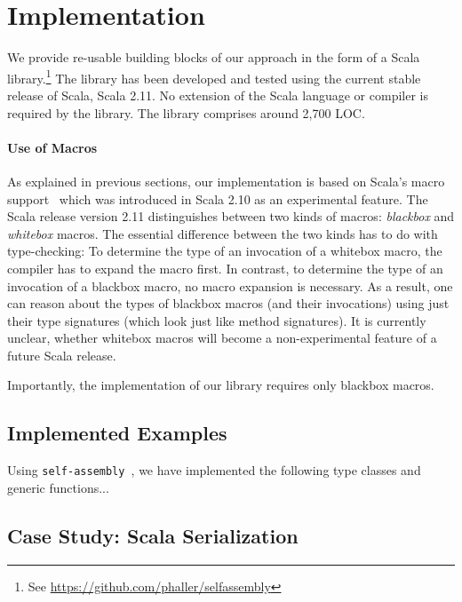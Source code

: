 \documentclass[preprint]{sigplanconf}
\newcommand{\selfassembly}{\texttt{self-assembly~}}
\begin{document}
\section{Implementation}

We provide re-usable building blocks of our approach in the form of a Scala
library.\footnote{See \url{https://github.com/phaller/selfassembly}} The
library has been developed and tested using the current stable release of
Scala, Scala 2.11. No extension of the Scala language or compiler is required
by the library. The library comprises around 2,700 LOC.


\paragraph{Use of Macros} As explained in previous sections, our
implementation is based on Scala's macro support~\cite{Burmako2012} which was
introduced in Scala 2.10 as an experimental feature. The Scala release version
2.11 distinguishes between two kinds of macros: \emph{blackbox} and
\emph{whitebox} macros. The essential difference between the two kinds has to
do with type-checking: To determine the type of an invocation of a whitebox
macro, the compiler has to expand the macro first. In contrast, to determine
the type of an invocation of a blackbox macro, no macro expansion is
necessary. As a result, one can reason about the types of blackbox macros (and
their invocations) using just their type signatures (which look just like
method signatures). It is currently unclear, whether whitebox macros will
become a non-experimental feature of a future Scala release.

Importantly, the implementation of our library requires only blackbox macros.

\subsection{Implemented Examples}

Using \selfassembly, we have implemented the following type classes and
generic functions...

\subsection{Case Study: Scala Serialization}
\end{document}
